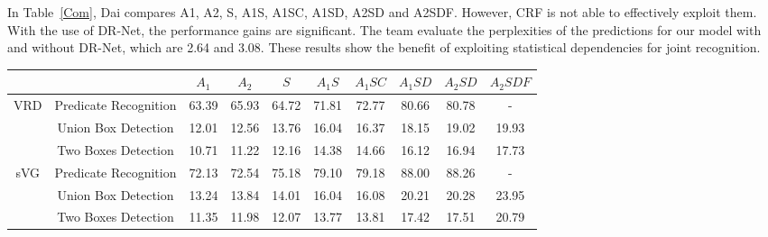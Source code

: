 \documentclass[10pt,twocolumn,letterpaper]{article}
\begin{document}
In Table~\ref{Com}, Dai compares A1, A2, S, A1S, A1SC, A1SD, A2SD and A2SDF. However, CRF is not able to effectively exploit them. With the use of DR-Net, the performance gains are significant. The team evaluate the perplexities of the predictions for our model with and without DR-Net, which are 2.64 and 3.08. These results show the benefit of exploiting statistical dependencies for joint recognition.

\begin{table*}[tp]
	\caption{Comparison of different variants of the proposed method, using \emph{Recall}@50 as the metric.} \label{Com}
	\begin{tabular}{|c|c|c|c|c|c|c|c|c|c|}
		   &  & $A_1$ & $A_2$ & $S$  & $A_1S$ & $A_1SC$ & $A_1SD$ & $A_2SD$ & $A_2SDF$ \\
		   \hline
		\multirow{3}{*}{VRD}& Predicate Recognition & 63.39 & 65.93 & 64.72  & 71.81 & 72.77 & 80.66 & 80.78 & - \\
		& Union Box Detection & 12.01 & 12.56 & 13.76  & 16.04 & 16.37 & 18.15 & 19.02 & 19.93 \\
		& Two Boxes Detection & 10.71 & 11.22 & 12.16  & 14.38 & 14.66 & 16.12 & 16.94 & 17.73 \\
		\hline\hline
		\multirow{3}{*}{sVG}& Predicate Recognition & 72.13 & 72.54 & 75.18  & 79.10 & 79.18 & 88.00 & 88.26 & - \\
		& Union Box Detection & 13.24 & 13.84 & 14.01  & 16.04 & 16.08 & 20.21 & 20.28 & 23.95 \\
		& Two Boxes Detection & 11.35 & 11.98 & 12.07  & 13.77 & 13.81 & 17.42 & 17.51 & 20.79 \\	
	\end{tabular}
\end{table*}

{\small


}
\end{document}
